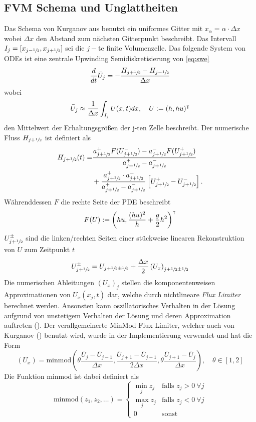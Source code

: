 \subsection{FVM Schema und Unglattheiten}
\label{sec:fvmFluxEigen}
Das Schema von Kurganov aus \cite{kurganov2007second} benutzt ein uniformes Gitter mit $x_\alpha=\alpha\cdot \Delta x$ wobei $\Delta x$ den Abstand zum nächsten Gitterpunkt beschreibt. Das Intervall $I_j = [x_{j-\sfrac{1}{2}},x_{j+\sfrac{1}{2}}]$ sei die $j-$te finite Volumenzelle.
Das folgende System von ODEs ist eine zentrale Upwinding Semidiskretisierung von \eqref{eq:swe} 
\[
 \frac{d}{dt} \bar U_j = - \frac{H_{j+\sfrac{1}{2}}-H_{j-\sfrac{1}{2}}}{\Delta x}
\]
wobei 
\[
 \bar U_j \approx \frac{1}{\Delta x}\int_{I_j} U(x,t) dx, \quad U:=(h,hu)^\intercal
\]
den Mittelwert der Erhaltungsgrößen der j-ten Zelle beschreibt. Der numerische Fluss $H_{j+\sfrac{1}{2}}$ ist definiert als
\[
\begin{aligned}
 H_{j+\sfrac{1}{2}}(t) =& \frac{a^+_{j+\sfrac{1}{2}}F(U^-_{j+\sfrac{1}{2}}) - a^-_{j+\sfrac{1}{2}}F(U^+_{j+\sfrac{1}{2}})}{a^+_{j+\sfrac{1}{2}} -a^-_{j+\sfrac{1}{2}}} \\
 & +\frac{a^+_{j+\sfrac{1}{2}} \cdot a^-_{j+\sfrac{1}{2}}}{a^+_{j+\sfrac{1}{2}} -a^-_{j+\sfrac{1}{2}}}\left[U^+_{j+\sfrac{1}{2}} - U^-_{j+\sfrac{1}{2}}\right].
\end{aligned}
 \]
Währenddessen $F$  die rechte Seite der PDE beschreibt
\[
 F(U) := \left( hu, \frac{(hu)^2}{h}  +\frac{g}{2} h^2 \right)^\intercal
\]
$U^\pm_{j+\sfrac{1}{2}}$ sind die linken/rechten Seiten einer stückweise linearen Rekonstruktion von $U$ zum Zeitpunkt $t$
\[
 U^\pm_{j+\sfrac{1}{2}} = U_{j+\sfrac{1}{2} \pm \sfrac{1}{2}} + \frac{\Delta x}{2} \left(U_x\right)_{j+\sfrac{1}{2}\pm\sfrac{1}{2}}
\]
Die numerischen Ableitungen $(U_x)_j$ stellen die komponentenweisen Approximationen von $U_x(x_j ,t)$ dar, welche durch nichtlineare \textit{Flux Limiter} berechnet werden. 
Ansonsten kann oszillatorisches Verhalten in der Lösung aufgrund von unstetigem Verhalten der Lösung und deren Approximation auftreten (\cite[Abschnitt 6.6]{leveque2002finite}).
Der verallgemeinerte MinMod Flux Limiter, welcher auch von Kurganov (\cite[(4.9)]{kurganov2000new}) benutzt wird, wurde in der Implementierung verwendet und hat die Form
\[
 \left(U_x\right) = \text{minmod}\left(\theta \frac{\bar U_j- \bar U_{j-1}}{\Delta x},\frac{\bar U_{j+1}- \bar U_{j-1}}{2\Delta x},\theta\frac{ \bar U_{j+1}- \bar U_{j}}{\Delta x}  \right), \quad \theta \in [1,2]
\]
Die Funktion minmod ist dabei definiert als
\[
 \text{minmod}(z_1,z_2,\ldots) = \begin{cases}
                                  \min_j z_j & \text{falls }z_j>0~\forall j\\
                                  \max_j z_j & \text{falls }z_j<0~\forall j\\
                                  0 & \text{sonst}
                                 \end{cases}
 \]
 
